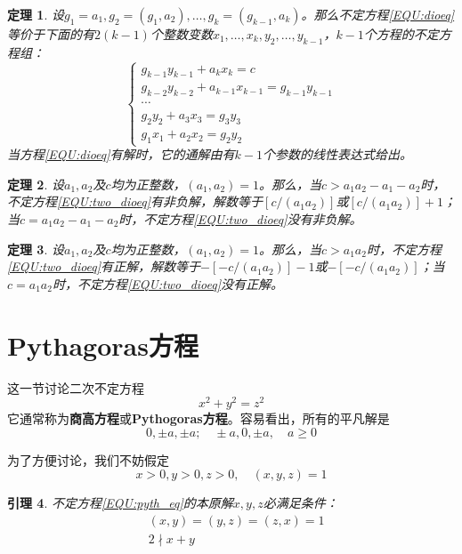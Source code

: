 \documentclass{ctexrep}
\newcommand{\bbold}[1]{\textbf{#1}}
\newtheorem{thrm}{定理}[section]
\newtheorem{lemm}[thrm]{引理}
\begin{document}
\begin{thrm}
设$g_1=a_1,g_2=(g_1,a_2),\dotsc,g_k=(g_{k-1},a_k)$。那么不定方程\ref{EQU:dioeq}等价于下面的有$2(k-1)$个整数变数$x_1,\dotsc,x_k,y_2,\dotsc,y_{k-1}$，$k-1$个方程的不定方程组：
\begin{displaymath}
\left\{
\begin{array}{l}
g_{k-1}y_{k-1}+a_kx_k=c\\
g_{k-2}y_{k-2}+a_{k-1}x_{k-1}=g_{k-1}y_{k-1}\\
\cdots\\
g_2y_2+a_3x_3=g_3y_3\\
g_1x_1+a_2x_2=g_2y_2
\end{array}
\right.
\end{displaymath}
当方程\ref{EQU:dioeq}有解时，它的通解由有$k-1$个参数的线性表达式给出。
\end{thrm}

\begin{thrm}
设$a_1,a_2$及$c$均为正整数，$(a_1,a_2)=1$。那么，当$c>a_1a_2-a_1-a_2$时，不定方程\ref{EQU:two_dioeq}有非负解，解数等于$[c/(a_1a_2)]$或$[c/(a_1a_2)]+1$；当$c=a_1a_2-a_1-a_2$时，不定方程\ref{EQU:two_dioeq}没有非负解。
\end{thrm}

\begin{thrm}
设$a_1,a_2$及$c$均为正整数，$(a_1,a_2)=1$。那么，当$c>a_1a_2$时，不定方程\ref{EQU:two_dioeq}有正解，解数等于$-[-c/(a_1a_2)]-1$或$-[-c/(a_1a_2)]$；当$c=a_1a_2$时，不定方程\ref{EQU:two_dioeq}没有正解。
\end{thrm}

\section{Pythagoras方程}
这一节讨论二次不定方程
\begin{equation}\label{EQU:pyth_eq}
x^2+y^2=z^2
\end{equation}
它通常称为\bbold{商高方程}或\bbold{Pythogoras方程}。容易看出，所有的平凡解是
\begin{displaymath}
0,\pm a,\pm a;\quad \pm a,0,\pm a,\quad a\geq 0
\end{displaymath}

为了方便讨论，我们不妨假定
\begin{displaymath}
x>0,y>0,z>0,\quad (x,y,z)=1
\end{displaymath}

\begin{lemm}
不定方程\ref{EQU:pyth_eq}的本原解$x,y,z$必满足条件：
\begin{eqnarray}
&(x,y)=(y,z)=(z,x)=1\\
&2\nmid x+y
\end{eqnarray}
\end{lemm}
\end{document}
